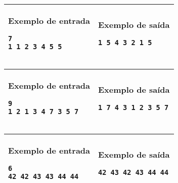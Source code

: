 \newpage
\begin{table}[!h]
\centering
\begin{tabular}{|l|l|}
\hline
\begin{minipage}[t]{3in}
\textbf{Exemplo de entrada}
\begin{verbatim}
7
1 1 2 3 4 5 5
\end{verbatim}
\vspace{1mm}
\end{minipage}
&
\begin{minipage}[t]{3in}
\textbf{Exemplo de saída}
\begin{verbatim}
1 5 4 3 2 1 5
\end{verbatim}
\vspace{1mm}
\end{minipage} \\
\hline
\end{tabular}
\end{table}

\begin{table}[!h]
\centering
\begin{tabular}{|l|l|}
\hline
\begin{minipage}[t]{3in}
\textbf{Exemplo de entrada}
\begin{verbatim}
9
1 2 1 3 4 7 3 5 7
\end{verbatim}
\vspace{1mm}
\end{minipage}
&
\begin{minipage}[t]{3in}
\textbf{Exemplo de saída}
\begin{verbatim}
1 7 4 3 1 2 3 5 7
\end{verbatim}
\vspace{1mm}
\end{minipage} \\
\hline
\end{tabular}
\end{table}

\begin{table}[!h]
\centering
\begin{tabular}{|l|l|}
\hline
\begin{minipage}[t]{3in}
\textbf{Exemplo de entrada}
\begin{verbatim}
6
42 42 43 43 44 44
\end{verbatim}
\vspace{1mm}
\end{minipage}
&
\begin{minipage}[t]{3in}
\textbf{Exemplo de saída}
\begin{verbatim}
42 43 42 43 44 44
\end{verbatim}
\vspace{1mm}
\end{minipage} \\
\hline
\end{tabular}
\end{table}
